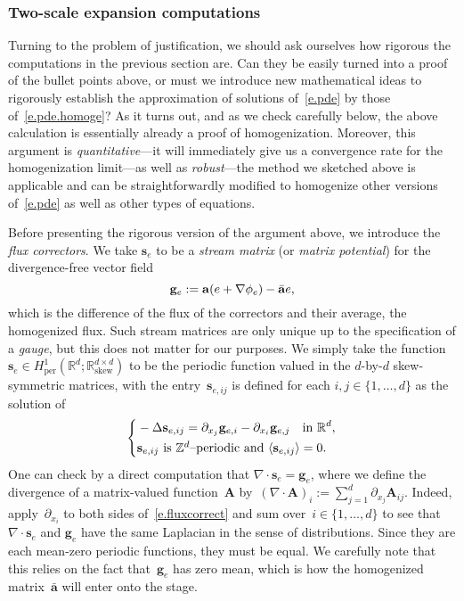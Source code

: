 \documentclass[11pt]{article} %
\numberwithin{equation}{section}
\theoremstyle{definition}
\let\originalleft\left
\let\originalright\right
\renewcommand{\left}{\mathopen{}\mathclose\bgroup\originalleft}
\renewcommand{\right}{\aftergroup\egroup\originalright}
\newcommand*{\Z}{\ensuremath{\mathbb{Z}}}
\newcommand*{\R}{\ensuremath{\mathbb{R}}}
\newcommand{\per}{\mathrm{per}}
\renewcommand{\skew}{\mathrm{skew}}
\newcommand{\g}{\mathbf{g}}
\newcommand{\s}{\mathbf{s}}
\renewcommand{\a}{\mathbf{a}}
\newcommand{\ahom}{\bar{\a}}
\begin{document}
\subsubsection{Two-scale expansion computations}

Turning to the problem of justification, we should ask ourselves how rigorous the computations in the previous section are. Can they be easily turned into a proof of the bullet points above, or must we introduce new mathematical ideas to rigorously establish the approximation of solutions of~\eqref{e.pde} by those of~\eqref{e.pde.homoge}? As it turns out, and as we check carefully below, the above calculation is essentially already a proof of homogenization. Moreover, this argument is \emph{quantitative}---it will immediately give us a convergence rate for the homogenization limit---as well as \emph{robust}---the method we sketched above is applicable and can be straightforwardly modified to homogenize other versions of~\eqref{e.pde} as well as other types of equations. 



Before presenting the rigorous version of the argument above, we introduce the \emph{flux correctors}. 
We  take $\s_e$ to be a \emph{stream matrix} (or \emph{matrix potential}) for the divergence-free vector field
\begin{equation}
\g_e := \a\left( e + \nabla\phi_e   \right) - \ahom e,
\end{equation}
which is the difference of the flux of the correctors and their average, the homogenized flux. Such stream matrices are only unique up to the specification of a \emph{gauge}, but this does not matter for our purposes. We simply take the function~$\s_e \in H^1_{\per}(\R^d;\R^{d\times d}_{\skew})$ to be the periodic function valued in the $d$-by-$d$ skew-symmetric matrices, with the entry~$\s_{e,ij}$ is defined for each $i,j\in\{1,\ldots,d\}$ as the solution of  
\begin{equation}
\label{e.fluxcorrect}
\left\{
\begin{aligned}
&
-\Delta \s_{e,ij} = 
\partial_{x_j} \g_{e,i} 
-
\partial_{x_i} \g_{e,j}
\quad \mbox{in}  \ \R^d, \\
& \s_{e,ij}  \ \mbox{is $\Z^d$--periodic and} \ \langle \s_{e,ij} \rangle = 0. 
\end{aligned}
\right. 
\end{equation}
One can check by a direct computation that $\nabla \cdot \s_e  = \g_e $, where we define the divergence of a matrix-valued function~$\mathbf{A}$ by~$(\nabla \cdot \mathbf{A})_i:= \sum_{j=1}^d \partial_{x_j} \mathbf{A}_{ij}$. 
Indeed, apply~$\partial_{x_i}$ to both sides of~\eqref{e.fluxcorrect} and sum over~$i \in \{1,\ldots,d\}$ to see that~$\nabla \cdot \s_e$ and $\g_e$ have the same Laplacian in the sense of distributions. Since they are each mean-zero periodic functions, they must be equal. We carefully note that this relies on the fact that~$\g_e $ has zero mean, which is how the homogenized matrix~$\ahom$ will enter onto the stage. 
\end{document}

